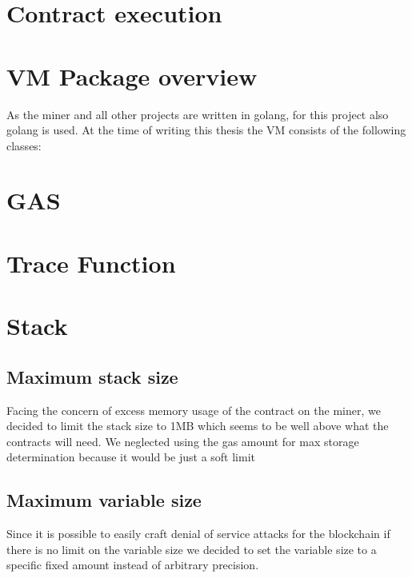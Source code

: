 \section{Contract execution}

\section{VM Package overview}
As the miner and all other projects are written in golang, for this project also golang is used.
At the time of writing this thesis the VM consists of the following classes:

\section{GAS}

\section{Trace Function}

\section{Stack}


\subsection{Maximum stack size}
Facing the concern of excess memory usage of the contract on the miner, we decided to limit the stack size to 1MB which seems to be well above what the contracts will need. We neglected using the gas amount for max storage determination because it would be just a soft limit

\subsection{Maximum variable size}
Since it is possible to easily craft denial of service attacks for the blockchain if there is no limit on the variable size we decided to set the variable size to a specific fixed amount instead of arbitrary precision.

